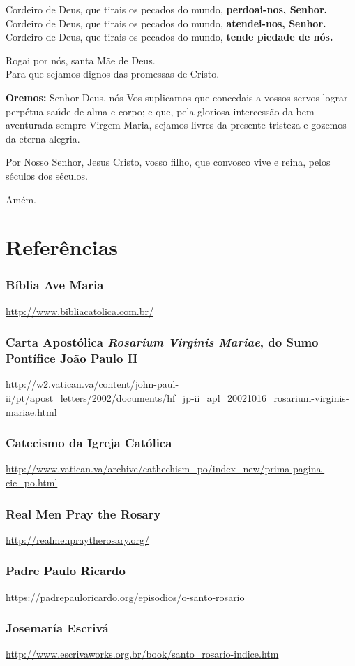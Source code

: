 \documentclass[10pt,a5paper]{book}
\newcommand{\from}[1]{\subsection*{#1}}
\begin{document}
Cordeiro de Deus, que tirais os pecados do mundo, \textbf{perdoai-nos, Senhor.} \\
Cordeiro de Deus, que tirais os pecados do mundo, \textbf{atendei-nos, Senhor.} \\
Cordeiro de Deus, que tirais os pecados do mundo, \textbf{tende piedade de nós.}

Rogai por nós, santa Mãe de Deus. \\
Para que sejamos dignos das promessas de Cristo.

\textbf{Oremos:}
Senhor Deus, nós Vos suplicamos que concedais a vossos servos lograr perpétua saúde de alma e corpo; e que, pela gloriosa intercessão da bem-aventurada sempre Virgem Maria, sejamos livres da presente tristeza e gozemos da eterna alegria.

Por Nosso Senhor, Jesus Cristo, vosso filho, que convosco vive e reina, pelos séculos dos séculos.

Amém.


\chapter{Referências}

\from{Bíblia Ave Maria}

\url{http://www.bibliacatolica.com.br/}

\from{Carta Apostólica \emph{Rosarium Virginis Mariae}, do Sumo Pontífice João Paulo II}

\url{http://w2.vatican.va/content/john-paul-ii/pt/apost_letters/2002/documents/hf_jp-ii_apl_20021016_rosarium-virginis-mariae.html}

\from{Catecismo da Igreja Católica}

\url{http://www.vatican.va/archive/cathechism_po/index_new/prima-pagina-cic_po.html}

\from{Real Men Pray the Rosary}

\url{http://realmenpraytherosary.org/}

\from{Padre Paulo Ricardo}

\url{https://padrepauloricardo.org/episodios/o-santo-rosario}

\from{Josemaría Escrivá}

\url{http://www.escrivaworks.org.br/book/santo_rosario-indice.htm}

\end{document}
